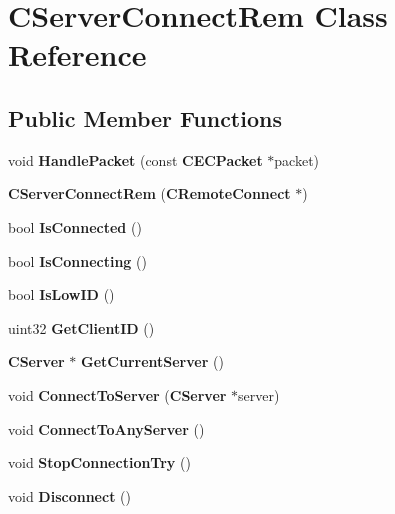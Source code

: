 \section{CServerConnectRem Class Reference}
\label{classCServerConnectRem}
\subsection*{Public Member Functions}
\begin{DoxyCompactItemize}
\item 
void {\bfseries HandlePacket} (const {\bf CECPacket} $\ast$packet)\label{classCServerConnectRem_a74f7ff82073d334c7b1ba6b702c1b7ae}

\item 
{\bfseries CServerConnectRem} ({\bf CRemoteConnect} $\ast$)\label{classCServerConnectRem_aac3719dd4d038b3830fe72043238cf80}

\item 
bool {\bfseries IsConnected} ()\label{classCServerConnectRem_a76e72705ffc592ce6eeaa830d56fb7c6}

\item 
bool {\bfseries IsConnecting} ()\label{classCServerConnectRem_ab8370969770473b3d4e4f28638a6c102}

\item 
bool {\bfseries IsLowID} ()\label{classCServerConnectRem_a39c8fc6a5df3dfa17490c2735d5e14f9}

\item 
uint32 {\bfseries GetClientID} ()\label{classCServerConnectRem_adaab42c7b1dd30390a5c5bd3efc3bc50}

\item 
{\bf CServer} $\ast$ {\bfseries GetCurrentServer} ()\label{classCServerConnectRem_a7fc4affb22de12f3ea726c39a97d846b}

\item 
void {\bfseries ConnectToServer} ({\bf CServer} $\ast$server)\label{classCServerConnectRem_abf74551a27335f7b3005b08d4ab3026c}

\item 
void {\bfseries ConnectToAnyServer} ()\label{classCServerConnectRem_ae4831680a727cf87a3415b421d609510}

\item 
void {\bfseries StopConnectionTry} ()\label{classCServerConnectRem_a16d02765d8a13c044152b36748b6eee8}

\item 
void {\bfseries Disconnect} ()\label{classCServerConnectRem_aa4d12b42602c794854fc4422d34620c7}

\end{DoxyCompactItemize}
